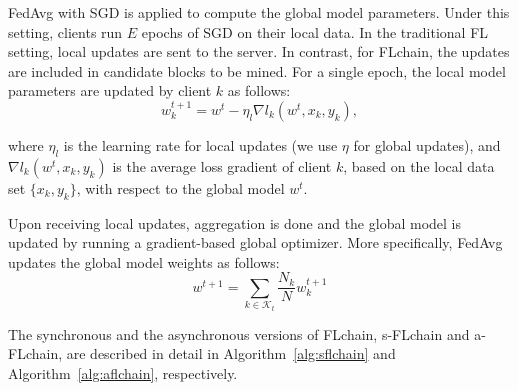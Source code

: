 \documentclass[10pt,journal,compsoc]{IEEEtran}
\begin{document}
FedAvg with SGD is applied to compute the global model parameters. Under this setting, clients run $E$ epochs of SGD on their local data. In the traditional FL setting, local updates are sent to the server. In contrast, for FLchain, the updates are included in candidate blocks to be mined. For a single epoch, the local model parameters are updated by client $k$ as follows:
\begin{equation}
w_k^{t+1} = w^t - \eta_l \nabla l_{k}(w^t,x_k,y_k),
\label{eq:2}
\end{equation}

where $\eta_l$ is the learning rate for local updates (we use $\eta$ for global updates), and $\nabla l_{k}(w^t,x_k,y_k)$ is the average loss gradient of client $k$, based on the local data set $\{x_k,y_k\}$, with respect to the global model $w^t$. 

Upon receiving local updates, aggregation is done and the global model is updated by running a gradient-based global optimizer. More specifically, FedAvg updates the global model weights as follows:
\begin{equation}
w^{t+1} = \sum_{k\in \mathcal{K}_t} \frac{N_k}{N} w_{k}^{t+1}
\label{eq:3}
\end{equation}

The synchronous and the asynchronous versions of FLchain, s-FLchain and a-FLchain, are described in detail in Algorithm~\ref{alg:sflchain} and Algorithm~\ref{alg:aflchain}, respectively.
\end{document}
